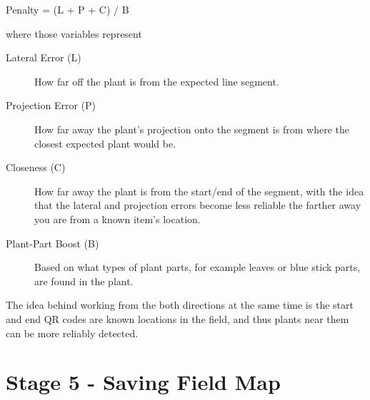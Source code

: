 Penalty = (L + P + C) / B

where those variables represent

\begin{description}
\item[Lateral Error (L)] How far off the plant is from the expected line segment.
\item[Projection Error (P)] How far away the plant's projection onto the segment is from where the closest expected plant would be.
\item[Closeness (C)] How far away the plant is from the start/end of the segment, with the idea that the lateral and projection errors become less reliable the farther away you are from a known item's location.
\item[Plant-Part Boost (B)] Based on what types of plant parts, for example leaves or blue stick parts, are found in the plant.
\end{description}

The idea behind working from the both directions at the same time is the start and end QR codes are known locations in the field, and thus plants near them can be more reliably detected. 


\section{Stage 5 - Saving Field Map}
\label{processing-stage5}
